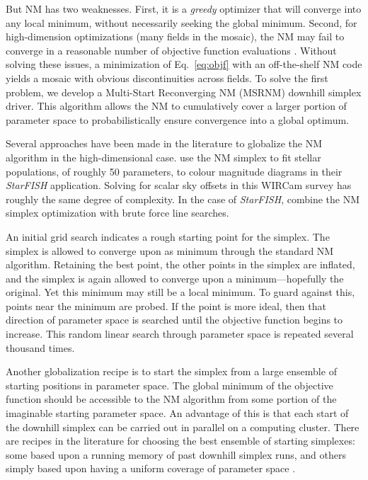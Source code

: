 \documentclass[iop]{emulateapj}
\newcommand{\eg}{\textit{e.g.,~}}
\newcommand{\sw}[1]{\textit{#1}} %
\newcommand{\Eq}[1]{Eq.~\ref{eq:#1}}  %
\begin{document}
But NM has two weaknesses.
First, it is a \emph{greedy} optimizer that will converge into any local minimum, without necessarily seeking the global minimum.
Second, for high-dimension optimizations (many fields in the mosaic), the NM may fail to converge in a reasonable number of objective function evaluations \citep{Neumann:2006}.
Without solving these issues, a minimization of \Eq{objf} with an off-the-shelf NM code yields a mosaic with obvious discontinuities across fields.
To solve the first problem, we develop a Multi-Start Reconverging NM (MSRNM) downhill simplex driver.
This algorithm allows the NM to cumulatively cover a larger portion of parameter space to probabilistically ensure convergence into a global optimum.

Several approaches have been made in the literature to globalize the NM algorithm in the high-dimensional case.
\cite{Harris:2001} use the NM simplex to fit stellar populations, of roughly 50 parameters, to colour magnitude diagrams in their \sw{StarFISH} application.
Solving for scalar sky offsets in this WIRCam survey has roughly the same degree of complexity.
In the case of \sw{StarFISH}, \citeauthor{Harris:2001} combine the NM simplex optimization with brute force line searches.

An initial grid search indicates a rough starting point for the simplex.
The simplex is allowed to converge upon as minimum through the standard NM algorithm.
Retaining the best point, the other points in the simplex are inflated, and the simplex is again allowed to converge upon a minimum---hopefully the original.
Yet this minimum may still be a local minimum.
To guard against this, points near the minimum are probed.
If the point is more ideal, then that direction of parameter space is searched until the objective function begins to increase.
This random linear search through parameter space is repeated several thousand times.

Another globalization recipe is to start the simplex from a large ensemble of starting positions in parameter space. The global minimum of the objective function should be accessible to the NM algorithm from some portion of the imaginable starting parameter space. An advantage of this is that each start of the downhill simplex can be carried out in parallel on a computing cluster. There are recipes in the literature for choosing the best ensemble of starting simplexes: some based upon a running memory of past downhill simplex runs, and others simply based upon having a uniform coverage of parameter space \citep[\eg][]{Luersen:2004,Wolff:2004}.
\end{document}
